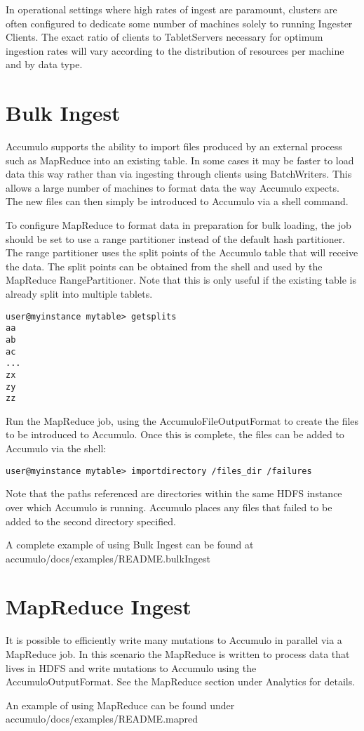 In operational settings where high rates of ingest are paramount, clusters are often
configured to dedicate some number of machines solely to running Ingester Clients.
The exact ratio of clients to TabletServers necessary for optimum ingestion rates
will vary according to the distribution of resources per machine and by data type.

\section{Bulk Ingest}

Accumulo supports the ability to import files produced by an external process such
as MapReduce into an existing table. In some cases it may be faster to load data this
way rather than via ingesting through clients using BatchWriters. This allows a large
number of machines to format data the way Accumulo expects. The new files can
then simply be introduced to Accumulo via a shell command.

To configure MapReduce to format data in preparation for bulk loading, the job
should be set to use a range partitioner instead of the default hash partitioner. The
range partitioner uses the split points of the Accumulo table that will receive the
data. The split points can be obtained from the shell and used by the MapReduce
RangePartitioner. Note that this is only useful if the existing table is already split
into multiple tablets.

\small
\begin{verbatim}
user@myinstance mytable> getsplits
aa
ab
ac
...
zx
zy
zz
\end{verbatim}
\normalsize

Run the MapReduce job, using the AccumuloFileOutputFormat to create the files to
be introduced to Accumulo. Once this is complete, the files can be added to
Accumulo via the shell:

\small
\begin{verbatim}
user@myinstance mytable> importdirectory /files_dir /failures
\end{verbatim}
\normalsize

Note that the paths referenced are directories within the same HDFS instance over
which Accumulo is running. Accumulo places any files that failed to be added to the
second directory specified.

A complete example of using Bulk Ingest can be found at\\
accumulo/docs/examples/README.bulkIngest

\section{MapReduce Ingest}
It is possible to efficiently write many mutations to Accumulo in parallel via a
MapReduce job. In this scenario the MapReduce is written to process data that lives
in HDFS and write mutations to Accumulo using the AccumuloOutputFormat. See
the MapReduce section under Analytics for details.

An example of using MapReduce can be found under\\
accumulo/docs/examples/README.mapred

